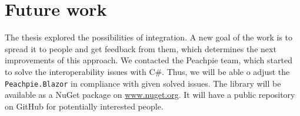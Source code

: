 \section{Future work}

The thesis explored the possibilities of integration.
A new goal of the work is to spread it to people and get feedback from them, which determines the next improvements of this approach.
We contacted the Peachpie team, which started to solve the interoperability issues with C\#.
Thus, we will be able o adjust the \texttt{Peachpie.Blazor} in compliance with given solved issues.
The library will be available as a NuGet package on \url{www.nuget.org}. It will have a public repository on GitHub for potentially interested people.

